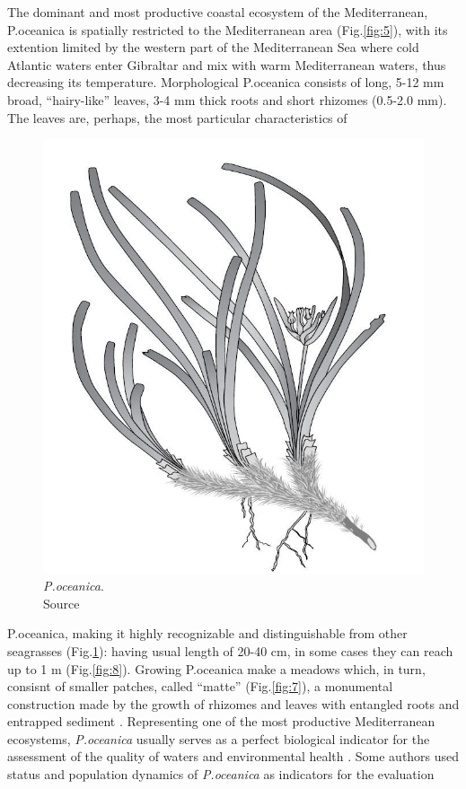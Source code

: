 \documentclass[10pt, a4paper]{article}
\begin{document}
The dominant and most productive coastal ecosystem of the Mediterranean, P.oceanica is
spatially restricted to the Mediterranean area (Fig.\ref{fig:5}), with its extention limited by the western part
of the Mediterranean Sea where cold Atlantic waters enter Gibraltar and mix with warm
Mediterranean waters, thus decreasing its temperature.
Morphological P.oceanica consists of long, 5-12 mm broad, “hairy-like” leaves, 3-4 mm thick roots
and short rhizomes (0.5-2.0 mm). The leaves are, perhaps, the most particular characteristics of

\begin{figure}
	\centering
	\includegraphics[scale=0.15]{Fig-1-6.jpg}
	\caption{\textit{P.oceanica}.\\
	Source \cite{Luque04}\label{Luque04}}
	\label{fig:6}
\end{figure}

P.oceanica, making it highly recognizable and distinguishable from other seagrasses (Fig.\ref{fig:6}): having
usual length of 20-40 cm, in some cases they can reach up to 1 m \cite{Borum04}\label{Borum04}  (Fig.\ref{fig:8}).
Growing P.oceanica make a meadows which, in turn, consisnt of smaller patches, called “matte”
(Fig.\ref{fig:7}), a monumental construction made by the growth of rhizomes and leaves with entangled roots
and entrapped sediment \cite{Francour06}\label{Francour06}.
Representing one of the most productive Mediterranean ecosystems, \textit{P.oceanica} usually serves as a
perfect biological indicator for the assessment of the quality of waters and environmental health
\cite{Boudouresque89}\label{Boudouresque89}. Some authors \cite{Guidetti08,Montefalcone09}\label{Guidetti08} \label{Montefalcone09} used status and population dynamics of \textit{P.oceanica} as indicators for the evaluation
\end{document}
